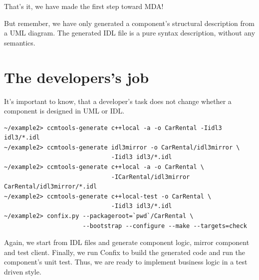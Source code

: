 That's it, we have made the first step toward MDA! 

But remember, we have only generated a component's structural description from
a UML diagram. The generated IDL file is a pure syntax description, without any semantics.  


\section{The developers's job}

It's important to know, that a developer's task does not change whether a component
is designed in UML or IDL.
\begin{small}
\begin{verbatim}
~/example2> ccmtools-generate c++local -a -o CarRental -Iidl3 idl3/*.idl  
~/example2> ccmtools-generate idl3mirror -o CarRental/idl3mirror \
                              -Iidl3 idl3/*.idl
~/example2> ccmtools-generate c++local -a -o CarRental \
                              -ICarRental/idl3mirror CarRental/idl3mirror/*.idl
~/example2> ccmtools-generate c++local-test -o CarRental \
                              -Iidl3 idl3/*.idl
~/example2> confix.py --packageroot=`pwd`/CarRental \
                      --bootstrap --configure --make --targets=check 
\end{verbatim}
\end{small}
Again, we start from IDL files and generate component logic, mirror component and test client.
Finally, we run Confix to build the generated code and run the component's unit test.
Thus, we are ready to implement business logic in a test driven style.